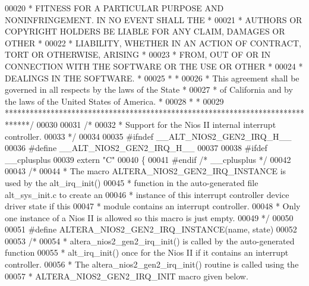\begin{DoxyCode}
00020 \textcolor{comment}{* FITNESS FOR A PARTICULAR PURPOSE AND NONINFRINGEMENT. IN NO EVENT SHALL THE *}
00021 \textcolor{comment}{* AUTHORS OR COPYRIGHT HOLDERS BE LIABLE FOR ANY CLAIM, DAMAGES OR OTHER      *}
00022 \textcolor{comment}{* LIABILITY, WHETHER IN AN ACTION OF CONTRACT, TORT OR OTHERWISE, ARISING     *}
00023 \textcolor{comment}{* FROM, OUT OF OR IN CONNECTION WITH THE SOFTWARE OR THE USE OR OTHER         *}
00024 \textcolor{comment}{* DEALINGS IN THE SOFTWARE.                                                   *}
00025 \textcolor{comment}{*                                                                             *}
00026 \textcolor{comment}{* This agreement shall be governed in all respects by the laws of the State   *}
00027 \textcolor{comment}{* of California and by the laws of the United States of America.              *}
00028 \textcolor{comment}{*                                                                             *}
00029 \textcolor{comment}{******************************************************************************/}
00030 
00031 \textcolor{comment}{/*}
00032 \textcolor{comment}{ * Support for the Nios II internal interrupt controller.}
00033 \textcolor{comment}{ */}
00034 
00035 \textcolor{preprocessor}{#ifndef \_\_ALT\_NIOS2\_GEN2\_IRQ\_H\_\_}
00036 \textcolor{preprocessor}{#define \_\_ALT\_NIOS2\_GEN2\_IRQ\_H\_\_}
00037 
00038 \textcolor{preprocessor}{#ifdef \_\_cplusplus}
00039 \textcolor{keyword}{extern} \textcolor{stringliteral}{"C"}
00040 \{
00041 \textcolor{preprocessor}{#endif }\textcolor{comment}{/* \_\_cplusplus */}\textcolor{preprocessor}{}
00042 
00043 \textcolor{comment}{/*}
00044 \textcolor{comment}{ * The macro ALTERA\_NIOS2\_GEN2\_IRQ\_INSTANCE is used by the alt\_irq\_init()}
00045 \textcolor{comment}{ * function in the auto-generated file alt\_sys\_init.c to create an}
00046 \textcolor{comment}{ * instance of this interrupt controller device driver state if this}
00047 \textcolor{comment}{ * module contains an interrupt controller.}
00048 \textcolor{comment}{ * Only one instance of a Nios II is allowed so this macro is just empty.}
00049 \textcolor{comment}{ */}
00050 
00051 \textcolor{preprocessor}{#define ALTERA\_NIOS2\_GEN2\_IRQ\_INSTANCE(name, state)}
00052 
00053 \textcolor{comment}{/*}
00054 \textcolor{comment}{ * altera\_nios2\_gen2\_irq\_init() is called by the auto-generated function }
00055 \textcolor{comment}{ * alt\_irq\_init() once for the Nios II if it contains an interrupt controller.}
00056 \textcolor{comment}{ * The altera\_nios2\_gen2\_irq\_init() routine is called using the }
00057 \textcolor{comment}{ * ALTERA\_NIOS2\_GEN2\_IRQ\_INIT macro given below.}

\end{DoxyCode}
